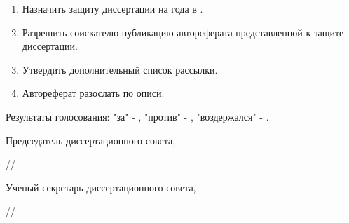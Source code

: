 \begin{enumerate}
        \item Назначить защиту диссертации на  года в .

        \item Разрешить соискателю публикацию автореферата представленной к защите диссертации.

        \item Утвердить дополнительный список рассылки.

        \item Автореферат разослать по описи.
    \end{enumerate}

    Результаты голосования: "за" - , "против" - , "воздержался" - .

    \vspace{5mm}
    
    Председатель диссертационного совета,
    
     \hfill \uline{\hspace{8em}} //
    
    \vspace{5mm}
    
    Ученый секретарь диссертационного совета,
    
     \hfill \uline{\hspace{8em}} //